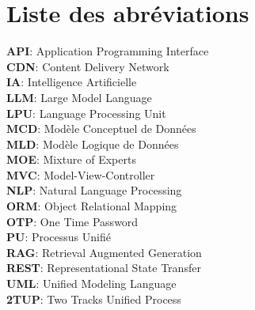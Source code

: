 \thispagestyle{empty}

\chapter*{Liste des abréviations}

\noindent
\vspace{0.5em}
\textbf{API}: Application Programming Interface \\
\vspace{0.5em}
\textbf{CDN}: Content Delivery Network \\
\vspace{0.5em}
\textbf{IA}: Intelligence Artificielle\\ 
\vspace{0.5em}
\textbf{LLM}: Large Model Language \\
\vspace{0.5em}
\textbf{LPU}: Language Processing Unit \\
\vspace{0.5em}
\textbf{MCD}: Modèle Conceptuel de Données \\ 
\vspace{0.5em}
\textbf{MLD}: Modèle Logique de Données \\
\vspace{0.5em}
\textbf{MOE}: Mixture of Experts \\
\vspace{0.5em}
\textbf{MVC}: Model-View-Controller \\
\vspace{0.5em}
\textbf{NLP}: Natural Language Processing \\
\vspace{0.5em}
\textbf{ORM}: Object Relational Mapping \\
\vspace{0.5em}
\textbf{OTP}: One Time Password \\
\vspace{0.5em}
\textbf{PU}: Processus Unifié \\
\vspace{0.5em}
\textbf{RAG}: Retrieval Augmented Generation \\
\vspace{0.5em}
\textbf{REST}: Representational State Transfer \\
\vspace{0.5em}
\textbf{UML}: Unified Modeling Language \\
\vspace{0.5em}
\textbf{2TUP}: Two Tracks Unified Process\\
